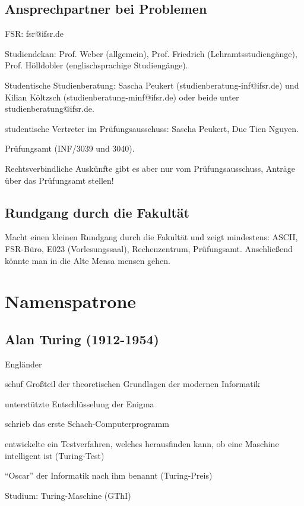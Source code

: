 \documentclass[a4paper,12pt]{report}
\begin{document}
\section{Ansprechpartner bei Problemen}
\begin{itemize*}
\item FSR: fsr@ifsr.de
\item Studiendekan: Prof. Weber (allgemein), Prof. Friedrich (Lehramtsstudiengänge), Prof. Hölldobler (englischsprachige Studiengänge).
\item Studentische Studienberatung: Sascha Peukert (studienberatung-inf@ifsr.de) und Kilian Költzsch (studienberatung-minf@ifsr.de) oder beide unter studienberatung@ifsr.de.
\item studentische Vertreter im Prüfungsausschuss: Sascha Peukert, Duc Tien Nguyen.
\item Prüfungsamt (INF/3039 und 3040).
\item Rechtsverbindliche Auskünfte gibt es aber nur vom Prüfungsausschuss, Anträge über das Prüfungsamt stellen!
\end{itemize*}

\section{Rundgang durch die Fakultät}
Macht einen kleinen Rundgang durch die Fakultät und zeigt mindestens: ASCII, FSR-Büro, E023 (Vorlesungssaal), Rechenzentrum, Prüfungsamt. Anschließend könnte man in die Alte Mensa mensen gehen.

\chapter{Namenspatrone}
\section{Alan Turing (1912-1954)}
\begin{itemize*}
\item Engländer
\item schuf Großteil der theoretischen Grundlagen der modernen Informatik
\item unterstützte Entschlüsselung der Enigma
\item schrieb das erste Schach-Computerprogramm
\item entwickelte ein Testverfahren, welches herausfinden kann, ob eine Maschine intelligent ist (Turing-Test)
\item ``Oscar'' der Informatik nach ihm benannt (Turing-Preis)
\item Studium: Turing-Maschine (GThI)
\end{itemize*}
\end{document}
